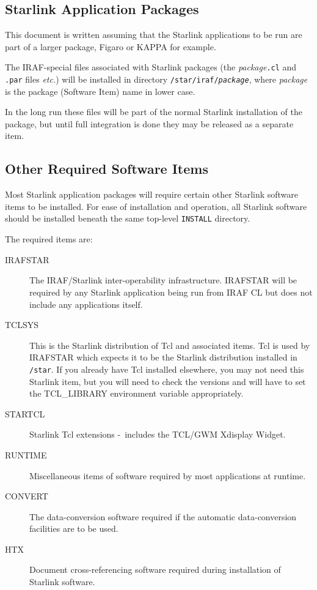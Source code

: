\documentclass[twoside,11pt]{article}
\newcommand{\htmladdnormallink}[2]{#1}
\newcommand{\xref}[3]{#1}
\newcommand{\xlabel}[1]{}
\newcommand{\dash}{--}
\renewcommand{\dash}{-}
\newcommand{\TCLURL}{http://sunscript.sun.com/tcltext.html}
\begin{document}
\subsection{\xlabel{starlink_application_packages}Starlink Application Packages}
This document is written assuming that the Starlink applications to be run are
part of a larger package, Figaro or KAPPA for example.

The IRAF-special files associated with Starlink packages (the 
\textit{package}{\texttt{.cl}} and \texttt{.par} files \textit{etc.}) will be 
installed in directory \texttt{/star/iraf/{\textit{package}}}, where 
\textit{package} is the package (Software Item) name in lower case.

In the long run these files will be part of the normal Starlink installation
of the package, but until full integration is done they may be released as
a separate item.

\subsection{\xlabel{other_required_software_items}Other Required Software Items}
Most Starlink application packages will require certain other Starlink software
items to be installed. For ease of installation and operation, all Starlink 
software should be installed beneath the same top-level \texttt{INSTALL} 
directory.

The required items are:
\begin{description}
\item[\xref{IRAFSTAR}{ssn35}{}] The IRAF/Starlink inter-operability 
infrastructure. IRAFSTAR
will be required by any Starlink application being run from IRAF CL but does
not include any applications itself. 
\item[\xref{TCLSYS}{sun200}{}] This is the Starlink distribution of 
\htmladdnormallink{Tcl}{\TCLURL}
and associated items. 
Tcl is used by IRAFSTAR which expects it to be the Starlink distribution
installed in \texttt{/star}. 
If you already have Tcl installed elsewhere, you may not need this Starlink 
item, but you will need to check the versions and will have to set the 
TCL\_LIBRARY environment variable appropriately.
\item[\xref{STARTCL}{sun186}{}] Starlink Tcl extensions \dash\ includes the
TCL/GWM Xdisplay Widget.
\item[RUNTIME] Miscellaneous items of software required by most applications
at runtime.
\item[\xref{CONVERT}{sun55}{}] The data-conversion software required if the 
automatic data-conversion facilities are to be used.
\item[\xref{HTX}{sun188}{}] Document cross-referencing software required during 
installation of Starlink software.
\end{description}
\end{document}
